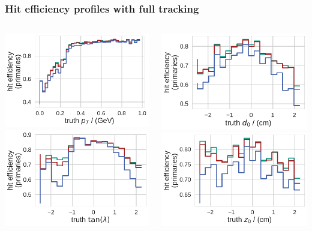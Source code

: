 \documentclass[18pt, aspectratio=169]{beamer}
\begin{document}
\begin{frame}
\begin{columns}
\begin{column}{.5\textwidth}
    \end{column}
  \end{columns}
\end{frame}

\begin{frame}
  \frametitle{Hit efficiency profiles with full tracking}
  \begin{columns}
    \begin{column}{.5\textwidth}
      \centering
      \includegraphics[width=.60\textwidth]{figures/hiteff_by_pt_truth_fullreco.pdf}\\
      \includegraphics[width=.60\textwidth]{figures/hiteff_by_tan_lambda_truth_fullreco.pdf}
    \end{column}    
    \begin{column}{.5\textwidth}
      \centering
      \includegraphics[width=.60\textwidth]{figures/hiteff_by_d0_truth_fullreco.pdf}\\
      \includegraphics[width=.60\textwidth]{figures/hiteff_by_z0_truth_fullreco.pdf}

\end{column}
\end{columns}
\end{frame}
\end{document}
